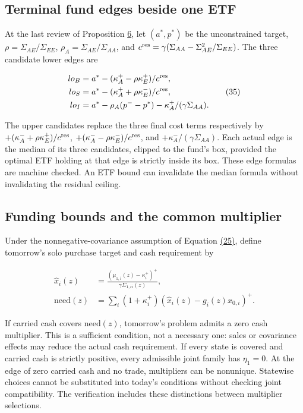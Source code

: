 \documentclass[11pt]{article}
\begin{document}
\subsection{Terminal fund edges beside one ETF}\label{sec:B.4}

At the last review of Proposition \hyperref[res:Proposition-6]{6}, let \((a^*,p^*)\) be the unconstrained target, \(\rho=\Sigma_{AE}/\Sigma_{EE}\), \(\rho_A=\Sigma_{AE}/\Sigma_{AA}\), and \(c^{\rm res}=\gamma(\Sigma_{AA}-\Sigma_{AE}^2/\Sigma_{EE})\). The three candidate lower edges are

\begin{equation*}
\begin{aligned}
lo_B&=a^*-(\kappa_A^+-\rho\kappa_E^+)/c^{\rm res},\\
lo_S&=a^*-(\kappa_A^++\rho\kappa_E^-)/c^{\rm res},\\
lo_I&=a^*-\rho_A(p^--p^*)-\kappa_A^+/(\gamma\Sigma_{AA}).
\end{aligned}
\tag{35}\label{eq:35}
\end{equation*}

The upper candidates replace the three final cost terms respectively by \(+(\kappa_A^-+\rho\kappa_E^+)/c^{\rm res}\), \(+(\kappa_A^--\rho\kappa_E^-)/c^{\rm res}\), and \(+\kappa_A^-/(\gamma\Sigma_{AA})\). Each actual edge is the median of its three candidates, clipped to the fund's box, provided the optimal ETF holding at that edge is strictly inside its box. These edge formulas are machine checked. An ETF bound can invalidate the median formula without invalidating the residual ceiling.

\subsection{Funding bounds and the common multiplier}\label{sec:B.5}

Under the nonnegative-covariance assumption of Equation \hyperref[eq:25]{(25)}, define tomorrow's solo purchase target and cash requirement by

\begin{equation*}
\begin{aligned}
\hat x_i(z)&=\frac{(\mu_{1,i}(z)-\kappa_i^+)^+}{\gamma\Sigma_{1,ii}(z)},\\
\mathrm{need}(z)&=\sum_i(1+\kappa_i^+)(\hat x_i(z)-g_i(z)x_{0,i})^+.
\end{aligned}
\tag{36}\label{eq:36}
\end{equation*}

If carried cash covers \(\mathrm{need}(z)\), tomorrow's problem admits a zero cash multiplier. This is a sufficient condition, not a necessary one: sales or covariance effects may reduce the actual cash requirement. If every state is covered and carried cash is strictly positive, every admissible joint family has \(\eta_1=0\). At the edge of zero carried cash and no trade, multipliers can be nonunique. Statewise choices cannot be substituted into today's conditions without checking joint compatibility. The verification includes these distinctions between multiplier selections.
\end{document}
